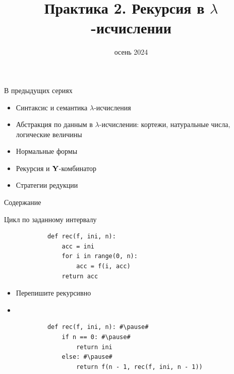 
\newif\ifhandout




\title[Рекурсия в $\lambda$-исчислении]{Практика 2. Рекурсия в $\lambda$-исчислении}
\date{осень 2024}



    \setcounter{framenumber}{-1}
    \maketitle

    \begin{frame}{В предыдущих сериях}
        \begin{itemize}
            \item Синтаксис и семантика $\lambda$-исчисления
            \item Абстракция по данным в $\lambda$-исчислении: кортежи, натуральные числа, логические величины
            \item[\newtopic] Нормальные формы
            \item[\newtopic] Рекурсия и $\mathbf{Y}$-комбинатор
            \item[\newtopic] Стратегии редукции
        \end{itemize}
    \end{frame}

    \begin{frame}[noframenumbering]{Содержание}
        \tableofcontents
    \end{frame}



    \begin{frame}[fragile]{Цикл по заданному интервалу}
        \begin{verbatim}
            def rec(f, ini, n):
                acc = ini
                for i in range(0, n):
                    acc = f(i, acc)
                return acc
        \end{verbatim}
        \begin{itemize}
            \item[\todo] Перепишите рекурсивно
            \item[\answer] \pause
        \end{itemize}
        \begin{verbatim}
            def rec(f, ini, n): #\pause#
                if n == 0: #\pause#
                    return ini
                else: #\pause#
                    return f(n - 1, rec(f, ini, n - 1))
        \end{verbatim}
    \end{frame}

